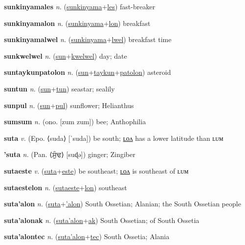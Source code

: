 \textbf{\hypertarget{sunkinyamales}{sunkinyamales}} \textit{n.} (\hyperlink{sunkinyama}{sunkinyama}+\allowbreak \hyperlink{les}{les})
fast-breaker

\textbf{\hypertarget{sunkinyamalon}{sunkinyamalon}} \textit{n.} (\hyperlink{sunkinyama}{sunkinyama}+\allowbreak \hyperlink{lon}{lon})
breakfast

\textbf{\hypertarget{sunkinyamalwel}{sunkinyamalwel}} \textit{n.} (\hyperlink{sunkinyama}{sunkinyama}+\allowbreak \hyperlink{lwel}{lwel})
breakfast time

\textbf{\hypertarget{sunkwelwel}{sunkwelwel}} \textit{n.} (\hyperlink{sun}{sun}+\allowbreak \hyperlink{kwelwel}{kwelwel})
day; date

\textbf{\hypertarget{suntaykunpatolon}{suntaykunpatolon}} \textit{n.} (\hyperlink{sun}{sun}+\allowbreak \hyperlink{taykun}{taykun}+\allowbreak \hyperlink{patolon}{patolon})
asteroid

\textbf{\hypertarget{suntun}{suntun}} \textit{n.} (\hyperlink{sun}{sun}+\allowbreak \hyperlink{tun}{tun})
seastar; sealily

\textbf{\hypertarget{sunpul}{sunpul}} \textit{n.} (\hyperlink{sun}{sun}+\allowbreak \hyperlink{pul}{pul})
sunflower; Helianthus

\textbf{\hypertarget{sumsum}{sumsum}} \textit{n.} (ono. [zum zum])
bee; Anthophilia

\textbf{\hypertarget{suta}{suta}} \textit{v.} (Epo. ⟨suda⟩ [ˈsuda])
be south; \hyperlink{sutalon}{ʟᴏᴧ} has a lower latitude than ʟᴜᴍ

\textbf{\hypertarget{'suta}{'suta}} \textit{n.} (Pan. ⟨{\gurmukhi{}ਸੁੰਢ}⟩ [suɖə])
ginger; Zingiber

\textbf{\hypertarget{sutaeste}{sutaeste}} \textit{v.} (\hyperlink{suta}{suta}+\allowbreak \hyperlink{este}{este})
be southeast; \hyperlink{sutaestelon}{ʟᴏᴧ} is southeast of ʟᴜᴍ

\textbf{\hypertarget{sutaestelon}{sutaestelon}} \textit{n.} (\hyperlink{sutaeste}{sutaeste}+\allowbreak \hyperlink{lon}{lon})
southeast

\textbf{\hypertarget{suta'alon}{suta'alon}} \textit{n.} (\hyperlink{suta}{suta}+\allowbreak \hyperlink{'alon}{'alon})
South Ossetian; Alanian; the South Ossetian people

\textbf{\hypertarget{suta'alonak}{suta'alonak}} \textit{n.} (\hyperlink{suta'alon}{suta'alon}+\allowbreak \hyperlink{ak}{ak})
South Ossetian; of South Ossetia

\textbf{\hypertarget{suta'alontec}{suta'alontec}} \textit{n.} (\hyperlink{suta'alon}{suta'alon}+\allowbreak \hyperlink{tec}{tec})
South Ossetia; Alania

